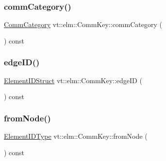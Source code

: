 \subsubsection{\texorpdfstring{comm\+Category()}{commCategory()}}
{\footnotesize\ttfamily \hyperlink{namespacevt_1_1elm_ab7367fdbe88bdcf329563642147f9ae2}{Comm\+Category} vt\+::elm\+::\+Comm\+Key\+::comm\+Category (\begin{DoxyParamCaption}{ }\end{DoxyParamCaption}) const\hspace{0.3cm}{\ttfamily [inline]}}

\mbox{\label{structvt_1_1elm_1_1_comm_key_a23b4e6a59e39eac8a5e631496e6cd618}} 
\subsubsection{\texorpdfstring{edge\+I\+D()}{edgeID()}}
{\footnotesize\ttfamily \hyperlink{structvt_1_1elm_1_1_element_i_d_struct}{Element\+I\+D\+Struct} vt\+::elm\+::\+Comm\+Key\+::edge\+ID (\begin{DoxyParamCaption}{ }\end{DoxyParamCaption}) const\hspace{0.3cm}{\ttfamily [inline]}}

\mbox{\label{structvt_1_1elm_1_1_comm_key_a0ca4110f2eec16b09cbb1201c3e094e6}} 
\subsubsection{\texorpdfstring{from\+Node()}{fromNode()}}
{\footnotesize\ttfamily \hyperlink{namespacevt_1_1elm_a63afb64985b41b7b6dcf2f01336391f8}{Element\+I\+D\+Type} vt\+::elm\+::\+Comm\+Key\+::from\+Node (\begin{DoxyParamCaption}{ }\end{DoxyParamCaption}) const\hspace{0.3cm}{\ttfamily [inline]}}

\mbox{\label{structvt_1_1elm_1_1_comm_key_a75f1afcaf2349cdc7de7bf8586ba8832}} 
